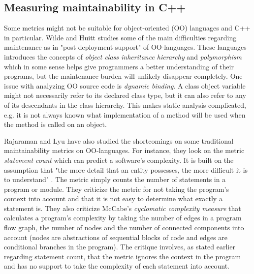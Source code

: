 \subsection{Measuring maintainability in C++}

Some metrics might not be suitable for object-oriented (OO) languages and C++
in particular. Wilde and Huitt \cite{wilde1991maintenance} studies some of the
main difficulties regarding maintenance as in "post deployment support" of
OO-languages. These languages introduces the concepts of \textit{object class
inheritance hierarchy} and \textit{polymorphism} which in some sense helps give
programmers a better understanding of their programs, but the maintenance
burden will unlikely disappear completely. One issue with analyzing OO source
code is \textit{dynamic binding}. A class object variable might not necessarily
refer to its declared class type, but it can also refer to any of its
descendants in the class hierarchy. This makes static analysis complicated,
e.g. it is not always known what implementation of a method will be used when
the method is called on an object.

Rajaraman and Lyu \cite{rajaraman1992reliability} have also studied the
shortcomings on some traditional maintainability metrics on OO-languages. For
instance, they look on the metric \textit{statement count} which can predict a
software's complexity. It is built on the assumption that "the more detail that
an entity possesses, the more difficult it is to understand"
\cite{rajaraman1992reliability}. The metric simply counts the number of
statements in a program or module. They criticize the metric for not taking the
program's context into account and that it is not easy to determine what
exactly a statement is. They also criticize McCabe's \textit{cyclomatic
complexity measure} \cite{mccabe1976complexity} that calculates a program's
complexity by taking the number of edges in a program flow graph, the number of
nodes and the number of connected components into account (nodes are
abstractions of sequential blocks of code and edges are conditional branches in
the program). The critique involves, as stated earlier regarding statement
count, that the metric ignores the context in the program and has no support to
take the complexity of each statement into account.

